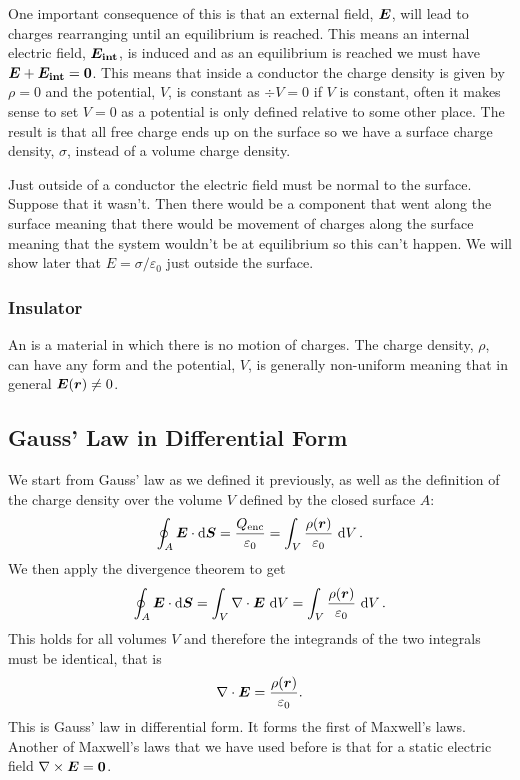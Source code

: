     One important consequence of this is that an external field, \(\bm{E}\), will lead to charges rearranging until an equilibrium is reached.
    This means an internal electric field, \(\bm{E_{\mathrm{int}}}\), is induced and as an equilibrium is reached we must have \(\bm{E} + \bm{E_{\mathrm{int}}} = \bm{0}\).
    This means that inside a conductor the charge density is given by \(\rho = 0\) and the potential, \(V\), is constant as \(\div V = 0\) if \(V\) is constant, often it makes sense to set \(V = 0\) as a potential is only defined relative to some other place.
    The result is that all free charge ends up on the surface so we have a surface charge density, \(\sigma\), instead of a volume charge density.
    
    Just outside of a conductor the electric field must be normal to the surface.
    Suppose that it wasn't.
    Then there would be a component that went along the surface meaning that there would be movement of charges along the surface meaning that the system wouldn't be at equilibrium so this can't happen.
    We will show later that \(E = \sigma/\varepsilon_0\) just outside the surface.
    
    \subsubsection{Insulator}
    An  is a material in which there is no motion of charges.
    The charge density, \(\rho\), can have any form and the potential, \(V\), is generally non-uniform meaning that in general \(\bm{E}(\bm{r})\ne 0\).
    
    \subsection{Gauss' Law in Differential Form}
    We start from Gauss' law as we defined it previously, as well as the definition of the charge density over the volume \(V\) defined by the closed surface \(A\):
    \[\oint_A \bm{E}\cdot\dd{\bm{S}} = \frac{Q_\mathrm{enc}}{\varepsilon_0} = \int_V\frac{\rho(\bm{r})}{\varepsilon_0}\,\dd{V}.\]
    We then apply the divergence theorem to get
    \[\oint_A \bm{E}\cdot\dd{\bm{S}} = \int_V \nabla\cdot\bm{E}\,\dd{V} = \int_V\frac{\rho(\bm{r})}{\varepsilon_0}\,\dd{V}.\]
    This holds for all volumes \(V\) and therefore the integrands of the two integrals must be identical, that is
    \[\nabla\cdot\bm{E} = \frac{\rho(\bm{r})}{\varepsilon_0}.\]
    This is Gauss' law in differential form.
    It forms the first of Maxwell's laws.
    Another of Maxwell's laws that we have used before is that for a static electric field \(\nabla\times\bm{E} = \bm{0}\).
    
